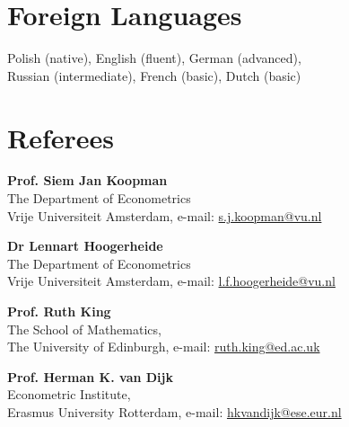 \documentclass[margin,line]{resume}
\begin{document}
\begin{resume}
   \section{\mysidestyle Foreign Languages}  
	Polish (native), English (fluent),  German (advanced),    \\
    Russian (intermediate),  French (basic),  Dutch (basic)

 
    
\section{\mysidestyle Referees} 

 \textbf{Prof. Siem Jan Koopman} \\    
 The Department of Econometrics \\
 Vrije Universiteit Amsterdam, e-mail: \url{s.j.koopman@vu.nl}

 \textbf{Dr Lennart Hoogerheide} \\  
 The Department of Econometrics \\  
 Vrije Universiteit Amsterdam, e-mail: \url{l.f.hoogerheide@vu.nl}

 \textbf{Prof. Ruth King} \\  
 The School of Mathematics,\\  
 The University of Edinburgh, e-mail: \url{ruth.king@ed.ac.uk}
 
 \textbf{Prof. Herman K. van Dijk} \\  
 Econometric Institute,\\  
 Erasmus University Rotterdam, e-mail: \url{hkvandijk@ese.eur.nl }
\end{resume}
\end{document}

